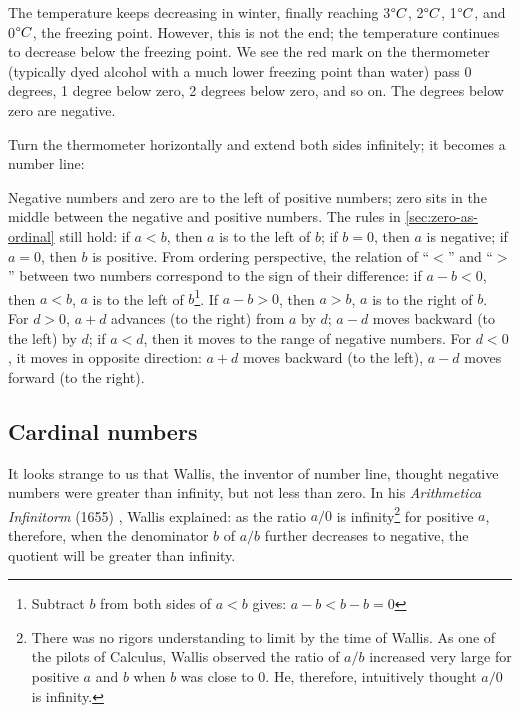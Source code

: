 \documentclass[b5paper]{article}
\begin{document}
\begin{example}
The temperature keeps decreasing in winter, finally reaching 3$\degree C$, 2$\degree C$, 1$\degree C$, and 0$\degree C$, the freezing point. However, this is not the end; the temperature continues to decrease below the freezing point. We see the red mark on the thermometer (typically dyed alcohol with a much lower freezing point than water) pass 0 degrees, 1 degree below zero, 2 degrees below zero, and so on. The degrees below zero are negative.
\end{example}

Turn the thermometer horizontally and extend both sides infinitely; it becomes a number line:

\begin{center}
\end{center}

Negative numbers and zero are to the left of positive numbers; zero sits in the middle between the negative and positive numbers. The rules in \cref{sec:zero-as-ordinal} still hold: if $a < b$, then $a$ is to the left of $b$; if $b = 0$, then $a$ is negative; if $a = 0$, then $b$ is positive. From ordering perspective, the relation of \enquote{$<$} and \enquote{$>$} between two numbers correspond to the sign of their difference: if $a - b < 0$, then $a < b$, $a$ is to the left of $b$\footnote{Subtract $b$ from both sides of $a < b$ gives: $a - b < b - b = 0$}. If $a - b > 0$, then $a > b$, $a$ is to the right of $b$. For $d > 0$, $a + d$ advances (to the right) from $a$ by $d$; $a - d$ moves backward (to the left) by $d$; if $a < d$, then it moves to the range of negative numbers. For $d < 0$, it moves in opposite direction: $a + d$ moves backward (to the left), $a - d$ moves forward (to the right).

\subsection{Cardinal numbers}
It looks strange to us that Wallis, the inventor of number line, thought negative numbers were greater than infinity, but not less than zero. In his \emph{Arithmetica Infinitorm} (1655) , Wallis explained: as the ratio $a/0$ is infinity\footnote{There was no rigors understanding to limit by the time of Wallis. As one of the pilots of Calculus, Wallis observed the ratio of $a/b$ increased very large for positive $a$ and $b$ when $b$ was close to 0. He, therefore, intuitively thought $a/0$ is infinity.} for positive $a$, therefore, when the denominator $b$ of $a/b$ further decreases to negative, the quotient will be greater than infinity\cite{MKlein-1972}.
\end{document}
